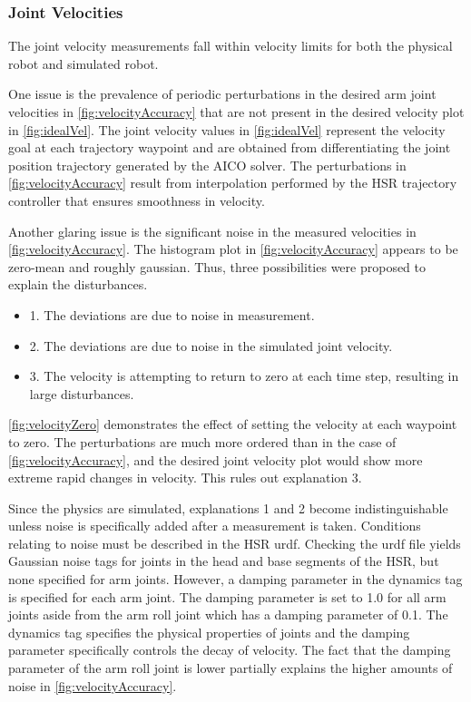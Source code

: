 \documentclass[11pt]{article}
\begin{document}
        \subsubsection{Joint Velocities}
            The joint velocity measurements fall within velocity limits for both the physical robot and simulated robot.
            \par One issue is the prevalence of periodic perturbations in the desired arm joint velocities in \cref{fig:velocityAccuracy} that are not present in the desired velocity plot in \cref{fig:idealVel}. The joint velocity values in \cref{fig:idealVel} represent the velocity goal at each trajectory waypoint and are obtained from differentiating the joint position trajectory generated by the AICO solver. The perturbations in \cref{fig:velocityAccuracy} result from interpolation performed by the HSR trajectory controller that ensures smoothness in velocity.

            \par Another glaring issue is the significant noise in the measured velocities in \cref{fig:velocityAccuracy}. The histogram plot in \cref{fig:velocityAccuracy} appears to be zero-mean and roughly gaussian. Thus, three possibilities were proposed to explain the disturbances.
            \begin{itemize}
                \item 1. The deviations are due to noise in measurement.
                \item 2. The deviations are due to noise in the simulated joint velocity.
                \item 3. The velocity is attempting to return to zero at each time step, resulting in large disturbances.
            \end{itemize}

            \cref{fig:velocityZero} demonstrates the effect of setting the velocity at each waypoint to zero. The perturbations are much more ordered than in the case of \cref{fig:velocityAccuracy}, and the desired joint velocity plot would show more extreme rapid changes in velocity. This rules out explanation 3. 

            \par Since the physics are simulated, explanations 1 and 2 become indistinguishable unless noise is specifically added after a measurement is taken. Conditions relating to noise must be described in the HSR urdf. Checking the urdf file yields Gaussian noise tags for joints in the head and base segments of the HSR, but none specified for arm joints. However, a damping parameter in the dynamics tag is specified for each arm joint. The damping parameter is set to 1.0 for all arm joints aside from the arm roll joint which has a damping parameter of 0.1. The dynamics tag specifies the physical properties of joints and the damping parameter specifically controls the decay of velocity. The fact that the damping parameter of the arm roll joint is lower partially explains the higher amounts of noise in \cref{fig:velocityAccuracy}.
\end{document}

